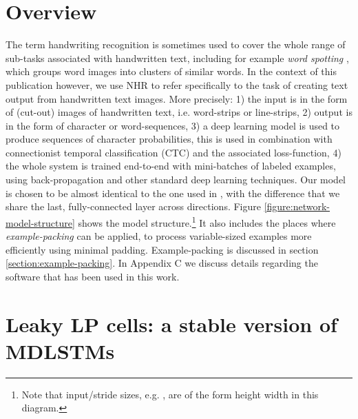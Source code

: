 \documentclass[conference]{IEEEtran}
\renewcommand{\ac}[1]{\gls{#1}}
\begin{document}
\section{Overview}
The term handwriting recognition is sometimes used to cover the whole range of sub-tasks associated with handwritten text, 
including for example \emph{word spotting} \cite{RathAndManmatha2007, FischerEtAl:2012}, which groups word images into clusters of similar 
words. In the context of this publication however, we use \ac{NHR} to refer specifically to the task of creating text output from 
handwritten text images. More precisely: 1) the input is in the form of (cut-out) images of handwritten text, i.e. word-strips or line-strips, 2) output is in the form of character or word-sequences, 3) a deep learning model is used to produce sequences 
of character probabilities, this is used in combination with connectionist temporal classification (CTC) \cite{Graves:2006:CTC}
and the associated loss-function, 4) the whole system is trained end-to-end with mini-batches of labeled examples, using 
back-propagation and other standard deep learning techniques.
Our  model is chosen to be almost identical to the one used in \cite{PhamEtAl2014}, 
with the difference that we share the last, fully-connected layer across directions.
Figure \ref{figure:network-model-structure} shows the model structure.\footnote{Note that input/stride sizes, e.g.  , are of the form height  width in this diagram.}
It also includes the places where \emph{example-packing} can be applied,
to process variable-sized examples more efficiently using minimal padding. Example-packing is discussed in section \ref{section:example-packing}.
In Appendix C we discuss details regarding the software that has been used in this work.


\section{Leaky LP cells: a stable version of MDLSTMs}
\label{section:leaky-lp-cells}
\end{document}
